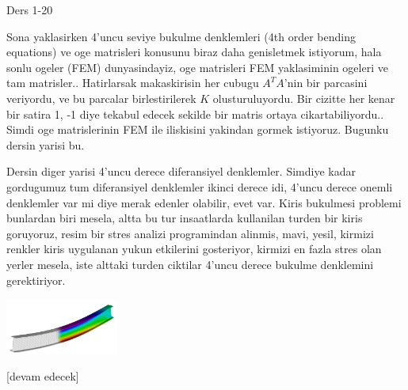 \documentclass[12pt,fleqn]{article}\usepackage{../../common}
\begin{document}
Ders 1-20

Sona yaklasirken 4'uncu seviye bukulme denklemleri (4th order bending equations)
ve oge matrisleri konusunu biraz daha genisletmek istiyorum, hala sonlu ogeler
(FEM) dunyasindayiz, oge matrisleri FEM yaklasiminin ogeleri ve tam
matrisler.. Hatirlarsak makaskirisin her cubugu $A^T A$'nin bir parcasini
veriyordu, ve bu parcalar birlestirilerek $K$ olusturuluyordu. Bir cizitte her
kenar bir satira 1, -1 diye tekabul edecek sekilde bir matris ortaya
cikartabiliyordu.. Simdi oge matrislerinin FEM ile iliskisini yakindan gormek
istiyoruz. Bugunku dersin yarisi bu.

Dersin diger yarisi 4'uncu derece diferansiyel denklemler. Simdiye kadar
gordugumuz tum diferansiyel denklemler ikinci derece idi, 4'uncu derece onemli
denklemler var mi diye merak edenler olabilir, evet var. Kiris bukulmesi
problemi bunlardan biri mesela, altta bu tur insaatlarda kullanilan turden bir
kiris goruyoruz, resim bir stres analizi programindan alinmis, mavi, yesil,
kirmizi renkler kiris uygulanan yukun etkilerini gosteriyor, kirmizi en fazla
stres olan yerler mesela, iste alttaki turden ciktilar 4'uncu derece bukulme
denklemini gerektiriyor.

\includegraphics[width=10em]{compscieng_1_20_01.png}

























[devam edecek]
\end{document}
